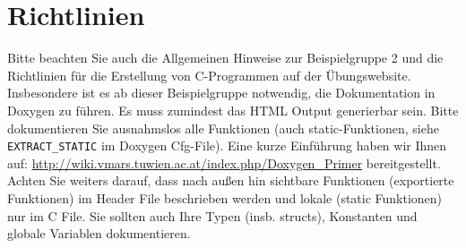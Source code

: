 \documentclass{article}
\begin{document}
\section*{Richtlinien}
Bitte beachten Sie auch die Allgemeinen Hinweise zur Beispielgruppe 2 und die Richtlinien f\"ur die Erstellung von C-Programmen auf der \"Ubungswebsite.
Insbesondere ist es ab dieser Beispielgruppe notwendig, die Dokumentation in Doxygen zu f\"uhren. Es muss zumindest das HTML Output generierbar sein. Bitte dokumentieren Sie ausnahmslos alle Funktionen (auch static-Funktionen, siehe \verb|EXTRACT_STATIC| im Doxygen Cfg-File). Eine kurze Einf\"uhrung haben wir Ihnen auf: \url{http://wiki.vmars.tuwien.ac.at/index.php/Doxygen_Primer} bereitgestellt. Achten Sie weiters darauf, dass nach au{\ss}en hin sichtbare Funktionen (exportierte Funktionen) im Header File beschrieben werden und lokale (static Funktionen) nur im C File. Sie sollten auch Ihre Typen (insb. structs), Konstanten und globale Variablen dokumentieren. 
\end{document}
